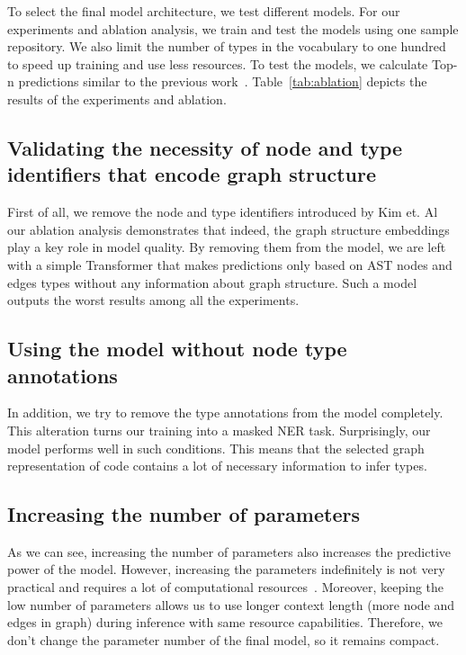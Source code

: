 To select the final model architecture, we test different models.
For our experiments and ablation analysis, we train and test the models using one sample repository.
We also limit the number of types in the vocabulary to one hundred to speed up training and use less resources.
To test the models, we calculate Top-n predictions similar to the previous work~\cite{mir_type4py_2021}.
Table~\ref{tab:ablation} depicts the results of the experiments and ablation.

\subsection{Validating the necessity of node and type identifiers that encode graph structure}\label{subsec:validating-the-necessity-of-node-and-type-identifiers-that-encode-graph-structure}

First of all, we remove the node and type identifiers introduced by Kim et. Al~\cite{kim_pure_2022} our ablation analysis demonstrates that indeed, the graph structure embeddings play a key role in model quality.
By removing them from the model, we are left with a simple Transformer that makes predictions only based on AST nodes and edges types without any information about graph structure.
Such a model outputs the worst results among all the experiments.

\subsection{Using the model without node type annotations}\label{subsec:using-the-model-without-node-type-annotations}

In addition, we try to remove the type annotations from the model completely.
This alteration turns our training into a masked NER task.
Surprisingly, our model performs well in such conditions.
This means that the selected graph representation of code contains a lot of necessary information to infer types.

\subsection{Increasing the number of parameters}\label{subsec:increasing-the-number-of-parameters}

As we can see, increasing the number of parameters also increases the predictive power of the model.
However, increasing the parameters indefinitely is not very practical and requires a lot of computational resources~\cite{arutyunov_big_2022}.
Moreover, keeping the low number of parameters allows us to use longer context length (more node and edges in graph) during inference with same resource capabilities.
Therefore, we don't change the parameter number of the final model, so it remains compact.

